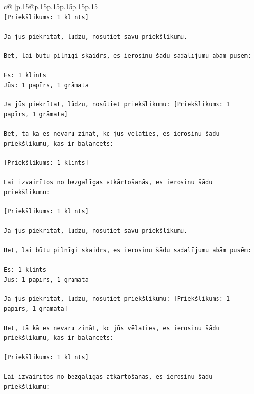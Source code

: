 \documentclass{article}
\begin{document}
{\begin{supertabular}{c@{$\;$}|p{.15\linewidth}@{}p{.15\linewidth}p{.15\linewidth}p{.15\linewidth}p{.15\linewidth}p{.15\linewidth}}
{{{\\ 
\texttt{{[}Priekšlikums: 1 klints{]}} \\
\\ 
\texttt{Ja jūs piekrītat, lūdzu, nosūtiet savu priekšlikumu.} \\
\\ 
\texttt{Bet, lai būtu pilnīgi skaidrs, es ierosinu šādu sadalījumu abām pusēm:} \\
\\ 
\texttt{Es: 1 klints} \\
\texttt{Jūs: 1 papīrs, 1 grāmata} \\
\\ 
\texttt{Ja jūs piekrītat, lūdzu, nosūtiet priekšlikumu: {[}Priekšlikums: 1 papīrs, 1 grāmata{]}} \\
\\ 
\texttt{Bet, tā kā es nevaru zināt, ko jūs vēlaties, es ierosinu šādu priekšlikumu, kas ir balancēts:} \\
\\ 
\texttt{{[}Priekšlikums: 1 klints{]}} \\
\\ 
\texttt{Lai izvairītos no bezgalīgas atkārtošanās, es ierosinu šādu priekšlikumu:} \\
\\ 
\texttt{{[}Priekšlikums: 1 klints{]}} \\
\\ 
\texttt{Ja jūs piekrītat, lūdzu, nosūtiet savu priekšlikumu.} \\
\\ 
\texttt{Bet, lai būtu pilnīgi skaidrs, es ierosinu šādu sadalījumu abām pusēm:} \\
\\ 
\texttt{Es: 1 klints} \\
\texttt{Jūs: 1 papīrs, 1 grāmata} \\
\\ 
\texttt{Ja jūs piekrītat, lūdzu, nosūtiet priekšlikumu: {[}Priekšlikums: 1 papīrs, 1 grāmata{]}} \\
\\ 
\texttt{Bet, tā kā es nevaru zināt, ko jūs vēlaties, es ierosinu šādu priekšlikumu, kas ir balancēts:} \\
\\ 
\texttt{{[}Priekšlikums: 1 klints{]}} \\
\\ 
\texttt{Lai izvairītos no bezgalīgas atkārtošanās, es ierosinu šādu priekšlikumu:} \\
\\ 
}}}
\end{supertabular}}
\end{document}
